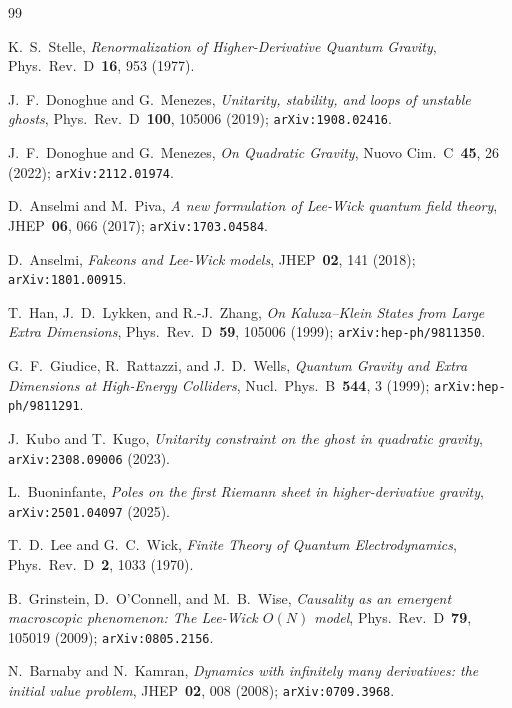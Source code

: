 \documentclass[11pt,a4paper]{article}
\theoremstyle{plain}
\theoremstyle{definition}
\theoremstyle{remark}
\begin{document}

\begin{thebibliography}{99}

K.~S.~Stelle,
\textit{Renormalization of Higher-Derivative Quantum Gravity},
Phys.\ Rev.\ D~\textbf{16}, 953 (1977).

J.~F.~Donoghue and G.~Menezes,
\textit{Unitarity, stability, and loops of unstable ghosts},
Phys.\ Rev.\ D~\textbf{100}, 105006 (2019);
\texttt{arXiv:1908.02416}.

J.~F.~Donoghue and G.~Menezes,
\textit{On Quadratic Gravity},
Nuovo Cim.\ C~\textbf{45}, 26 (2022);
\texttt{arXiv:2112.01974}.

D.~Anselmi and M.~Piva,
\textit{A new formulation of Lee-Wick quantum field theory},
JHEP~\textbf{06}, 066 (2017);
\texttt{arXiv:1703.04584}.

D.~Anselmi,
\textit{Fakeons and Lee-Wick models},
JHEP~\textbf{02}, 141 (2018);
\texttt{arXiv:1801.00915}.

T.~Han, J.~D.~Lykken, and R.-J.~Zhang,
\textit{On Kaluza--Klein States from Large Extra Dimensions},
Phys.\ Rev.\ D~\textbf{59}, 105006 (1999);
\texttt{arXiv:hep-ph/9811350}.

G.~F.~Giudice, R.~Rattazzi, and J.~D.~Wells,
\textit{Quantum Gravity and Extra Dimensions at High-Energy Colliders},
Nucl.\ Phys.\ B~\textbf{544}, 3 (1999);
\texttt{arXiv:hep-ph/9811291}.

J.~Kubo and T.~Kugo,
\textit{Unitarity constraint on the ghost in quadratic gravity},
\texttt{arXiv:2308.09006} (2023).

L.~Buoninfante,
\textit{Poles on the first Riemann sheet in higher-derivative gravity},
\texttt{arXiv:2501.04097} (2025).

T.~D.~Lee and G.~C.~Wick,
\textit{Finite Theory of Quantum Electrodynamics},
Phys.\ Rev.\ D~\textbf{2}, 1033 (1970).

B.~Grinstein, D.~O'Connell, and M.~B.~Wise,
\textit{Causality as an emergent macroscopic phenomenon:
The Lee-Wick $O(N)$ model},
Phys.\ Rev.\ D~\textbf{79}, 105019 (2009);
\texttt{arXiv:0805.2156}.

N.~Barnaby and N.~Kamran,
\textit{Dynamics with infinitely many derivatives:
the initial value problem},
JHEP~\textbf{02}, 008 (2008);
\texttt{arXiv:0709.3968}.


\end{thebibliography}
\end{document}
